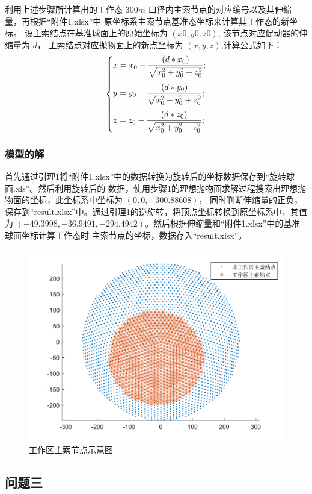 \documentclass[withoutpreface,bwprint]{cumcmthesis} %
\begin{document}
利用上述步骤所计算出的工作态 $300m$ 口径内主索节点的对应编号以及其伸缩量，再根据“附件1.xlsx”中
原坐标系主索节点基准态坐标来计算其工作态的新坐标。
设主索结点在基准球面上的原始坐标为 $(x0, y0, z0)$, 该节点对应促动器的伸缩量为 $d$，
主索结点对应抛物面上的新点坐标为 $(x, y,z)$,计算公式如下：
\[
    \begin{dcases}
        \smallskip
        x = x_0 - \frac{(d*x_0)}{\sqrt{x_0^2+y_0^2+z_0^2}}; \\
        \smallskip
        y = y_0 - \frac{(d*y_0)}{\sqrt{x_0^2+y_0^2+z_0^2}}; \\
        z = z_0 - \frac{(d*z_0)}{\sqrt{x_0^2+y_0^2+z_0^2}};
    \end{dcases}
\]
\subsubsection{模型的解}
首先通过引理1将“附件1.xlsx”中的数据转换为旋转后的坐标数据保存到“旋转球面.xls”。然后利用旋转后的
数据，使用步骤1的理想抛物面求解过程搜索出理想抛物面的坐标，此坐标系中坐标为 $(0,0,-300.88608)$，
同时判断伸缩量的正负，保存到“result.xlsx”中。通过引理1的逆旋转，将顶点坐标转换到原坐标系中，其值
为 $(-49.3998,-36.9491,-294.4942)$。然后根据伸缩量和“附件1.xlsx”中的基准球面坐标计算工作态时
主索节点的坐标，数据存入“result.xlsx”。
\begin{figure}[!h]
    \centering
    \includegraphics[scale=0.8]{A2.pdf}
    \caption{工作区主索节点示意图}
\end{figure}
\subsection{问题三}
\end{document}
